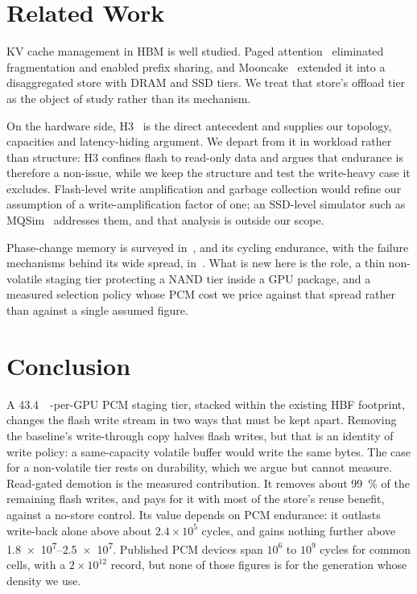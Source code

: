 \documentclass[conference]{IEEEtran}
\begin{document}
\section{Related Work}
KV cache management in HBM is well studied. Paged attention~\cite{vllm}
eliminated fragmentation and enabled prefix sharing, and
Mooncake~\cite{mooncake} extended it into a disaggregated store with DRAM and
SSD tiers. We treat that store's offload tier as the object of study rather
than its mechanism.

On the hardware side, H3~\cite{h3} is the direct antecedent and supplies our
topology, capacities and latency-hiding argument. We depart from it in workload
rather than structure: H3 confines flash to read-only data and argues that
endurance is therefore a non-issue, while we keep the structure and test the
write-heavy case it excludes. Flash-level write amplification and garbage
collection would refine our assumption of a write-amplification factor of one;
an SSD-level simulator such as MQSim~\cite{mqsim} addresses them, and that
analysis is outside our scope.

Phase-change memory is surveyed in~\cite{wong2010pcm,burr2010pcm}, and its
cycling endurance, with the failure mechanisms behind its wide spread,
in~\cite{kim2019mrs}. What is new here is the role, a thin non-volatile staging
tier protecting a NAND tier inside a GPU package, and a measured selection
policy whose PCM cost we price against that spread rather than against a
single assumed figure.

\section{Conclusion}
A \SI{43.4}{\gibi\byte}-per-GPU PCM staging tier, stacked within the existing
HBF footprint, changes the flash write stream in two ways that must be kept
apart. Removing the baseline's write-through copy halves flash writes, but that
is an identity of write policy: a same-capacity volatile buffer would write the
same bytes. The case for a non-volatile tier rests on durability, which we
argue but cannot measure. Read-gated demotion is the measured contribution. It
removes about \SI{99}{\percent} of the remaining flash writes, and pays for it
with most of the store's reuse benefit, against a no-store control. Its value
depends on PCM endurance: it outlasts write-back alone above about
$2.4\times10^{5}$ cycles, and gains nothing further above
\numrange{1.8e7}{2.5e7}. Published PCM devices span $10^{6}$ to $10^{9}$ cycles
for common cells, with a $2\times10^{12}$ record, but none of those figures is
for the generation whose density we use.
\end{document}
